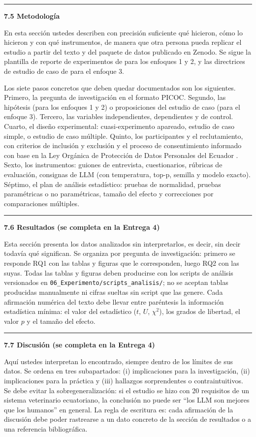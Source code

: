 \documentclass[11pt,a4paper]{article}
\newcounter{secc}
\newcommand{\submark}[1]{\par\vspace{4pt}\noindent
    {\color{uteqgreen}\rule[-1pt]{3.5pt}{12pt}}\hspace{6pt}\textbf{\color{uteqgreen}#1}\par\vspace{2pt}}
\begin{document}
\submark{7.5 Metodología}
En esta sección ustedes describen con precisión suficiente qué hicieron, cómo lo hicieron y con qué instrumentos, de manera que otra persona pueda replicar el estudio a partir del texto y del paquete de datos publicado en Zenodo.
Se sigue la plantilla de reporte de experimentos de \cite{jedlitschka2008reporting} para los enfoques 1 y 2, y las directrices de estudio de caso de \cite{runeson2009guidelines} para el enfoque 3.

Los siete pasos concretos que deben quedar documentados son los siguientes.
Primero, la pregunta de investigación en el formato PICOC.
Segundo, las hipótesis (para los enfoques 1 y 2) o proposiciones del estudio de caso (para el enfoque 3).
Tercero, las variables independientes, dependientes y de control.
Cuarto, el diseño experimental: cuasi-experimento apareado, estudio de caso simple, o estudio de caso múltiple.
Quinto, los participantes y el reclutamiento, con criterios de inclusión y exclusión y el proceso de consentimiento informado con base en la Ley Orgánica de Protección de Datos Personales del Ecuador \cite{ley_datos_ecuador_2021}.
Sexto, los instrumentos: guiones de entrevista, cuestionarios, rúbricas de evaluación, consignas de LLM (con temperatura, top-p, semilla y modelo exacto).
Séptimo, el plan de análisis estadístico: pruebas de normalidad, pruebas paramétricas o no paramétricas, tamaño del efecto y correcciones por comparaciones múltiples.

\submark{7.6 Resultados (se completa en la Entrega 4)}
Esta sección presenta los datos analizados sin interpretarlos, es decir, sin decir todavía qué significan.
Se organiza por pregunta de investigación: primero se responde RQ1 con las tablas y figuras que le corresponden, luego RQ2 con las suyas.
Todas las tablas y figuras deben producirse con los scripts de análisis versionados en \texttt{06\_Experimento/scripts\_analisis/}; no se aceptan tablas producidas manualmente ni cifras sueltas sin script que las genere.
Cada afirmación numérica del texto debe llevar entre paréntesis la información estadística mínima: el valor del estadístico ($t$, $U$, $\chi^2$), los grados de libertad, el valor $p$ y el tamaño del efecto.

\submark{7.7 Discusión (se completa en la Entrega 4)}
Aquí ustedes interpretan lo encontrado, siempre dentro de los límites de sus datos.
Se ordena en tres subapartados: (i) implicaciones para la investigación, (ii) implicaciones para la práctica y (iii) hallazgos sorprendentes o contraintuitivos.
Se debe evitar la sobregeneralización: si el estudio se hizo con 20 requisitos de un sistema veterinario ecuatoriano, la conclusión no puede ser ``los LLM son mejores que los humanos'' en general.
La regla de escritura es: cada afirmación de la discusión debe poder rastrearse a un dato concreto de la sección de resultados o a una referencia bibliográfica.
\end{document}
